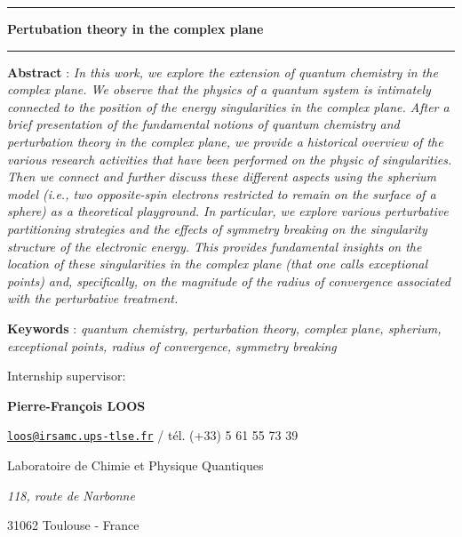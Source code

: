 \documentclass[11pt,a4paper]{article}
\begin{document}
\begin{center}

\vspace{1.5cm}

\rule[11pt]{5cm}{0.5pt}

\textbf{\huge Pertubation theory in the complex plane}

\rule{5cm}{0.5pt}

\vspace{1.5cm}

\parbox{15cm}{\small
\textbf{Abstract} : \it In this work, we explore the extension of quantum chemistry in the complex plane. We observe that the physics of a quantum system is intimately connected to the position of the energy singularities in the complex plane. After a brief presentation of the fundamental notions of quantum chemistry and perturbation theory in the complex plane, we provide a historical overview of the various research activities that have been performed on the physic of singularities. Then we connect and further discuss these different aspects using the spherium model (i.e., two opposite-spin electrons restricted to remain on the surface of a sphere) as a theoretical playground. In particular, we explore various perturbative partitioning strategies and the effects of symmetry breaking on the singularity structure of the electronic energy. This provides fundamental insights on the location of these singularities in the complex plane (that one calls exceptional points) and, specifically, on the magnitude of the radius of convergence associated with the perturbative treatment.
}

\vspace{0.5cm}

\parbox{15cm}{
\textbf{Keywords} : \it quantum chemistry, perturbation theory, complex plane, spherium, exceptional points, radius of convergence, symmetry breaking
} %

\vspace{0.5cm}

\parbox{15cm}{
Internship supervisor:

{\bf Pierre-François \textsc{LOOS}}

\href{mailto:loos@irsamc.ups-tlse.fr}{\tt loos@irsamc.ups-tlse.fr} / tél. (+33) 5 61 55 73 39

Laboratoire de Chimie et Physique Quantiques

{\it 118, route de Narbonne

31062 Toulouse - France}

}
\end{center}
\end{document}
